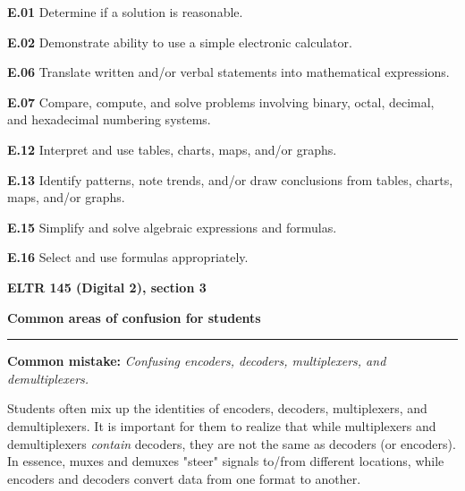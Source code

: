 \item{\bf E.01} Determine if a solution is reasonable.
\item{\bf E.02} Demonstrate ability to use a simple electronic calculator.
\item{\bf E.06} Translate written and/or verbal statements into mathematical expressions.
\item{\bf E.07} Compare, compute, and solve problems involving binary, octal, decimal, and hexadecimal numbering systems.
\item{\bf E.12} Interpret and use tables, charts, maps, and/or graphs.
\item{\bf E.13} Identify patterns, note trends, and/or draw conclusions from tables, charts, maps, and/or graphs.
\item{\bf E.15} Simplify and solve algebraic expressions and formulas.
\item{\bf E.16} Select and use formulas appropriately.
\medskip





\vfil \eject

\centerline{\bf ELTR 145 (Digital 2), section 3} \bigskip 
 
\vskip 10pt

\noindent
{\bf Common areas of confusion for students}

\vskip 5pt

\hrule \vskip 5pt

\vskip 10pt

\noindent
{\bf Common mistake: } {\it Confusing encoders, decoders, multiplexers, and demultiplexers.}

Students often mix up the identities of encoders, decoders, multiplexers, and demultiplexers.  It is important for them to realize that while multiplexers and demultiplexers {\it contain} decoders, they are not the same as decoders (or encoders).  In essence, muxes and demuxes "steer" signals to/from different locations, while encoders and decoders convert data from one format to another.



